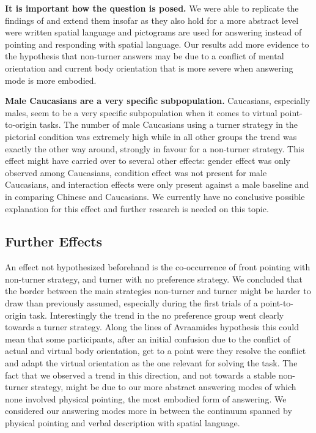\documentclass{frontiersSCNS} %
\begin{document}
\textbf{It is important how the question is posed.}
We were able to replicate the findings of \citep{Avraamides2004} and extend them insofar as they also hold for a more abstract level were written spatial language and pictograms are used for answering instead of pointing and responding with spatial language. Our results add more evidence to the hypothesis that non-turner answers may be due to a conflict of mental orientation and current body orientation that is more severe when answering mode is more embodied.

\textbf{Male Caucasians are a very specific subpopulation.}
Caucasians, especially males, seem to be a very specific subpopulation when it comes to virtual point-to-origin tasks. The number of male Caucasians using a turner strategy in the pictorial condition was extremely high while in all other groups the trend was exactly the other way around, strongly in favour for a non-turner strategy. This effect might have carried over to several other effects: gender effect was only observed among Caucasians, condition effect was not present for male Caucasians, and interaction effects were only present against a male baseline and in comparing Chinese and Caucasians.  We currently have no conclusive possible explanation for this effect and further research is needed on this topic.

\subsection{Further Effects}
An effect not hypothesized beforehand is the co-occurrence of front pointing with non-turner strategy, and turner with no preference strategy. We concluded that the border between the main strategies non-turner and turner might be harder to draw than previously assumed, especially during the first trials of a point-to-origin task. Interestingly the trend in the no preference group went clearly towards a turner strategy. Along the lines of Avraamides hypothesis this could mean that some participants, after an initial confusion due to the conflict of actual and virtual body orientation, get to a point were they resolve the conflict and adapt the virtual orientation as the one relevant for solving the task. The fact that we observed a trend in this direction, and not towards a stable non-turner strategy, might be due to our more abstract answering modes of which none involved physical pointing, the most embodied form of answering. We considered our answering modes more in between the continuum spanned by physical pointing and verbal description with spatial language.
\end{document}
